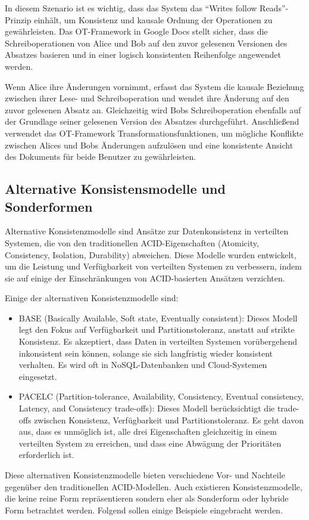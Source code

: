 \documentclass[../vs-script-first-v01.tex]{subfiles}
\begin{document}
In diesem Szenario ist es wichtig, dass das System das \enquote{Writes follow Reads}-Prinzip einhält, um Konsistenz und kausale Ordnung der Operationen zu gewährleisten. Das OT-Framework in Google Docs stellt sicher, dass die Schreiboperationen von Alice und Bob auf den zuvor gelesenen Versionen des Absatzes basieren und in einer logisch konsistenten Reihenfolge angewendet werden.

Wenn Alice ihre Änderungen vornimmt, erfasst das System die kausale Beziehung zwischen ihrer Lese- und Schreiboperation und wendet ihre Änderung auf den zuvor gelesenen Absatz an. Gleichzeitig wird Bobs Schreiboperation ebenfalls auf der Grundlage seiner gelesenen Version des Absatzes durchgeführt. Anschließend verwendet das OT-Framework Transformationsfunktionen, um mögliche Konflikte zwischen Alices und Bobs Änderungen aufzulösen und eine konsistente Ansicht des Dokuments für beide Benutzer zu gewährleisten.

\subsection{Alternative Konsistensmodelle und Sonderformen}
Alternative Konsistenzmodelle sind Ansätze zur Datenkonsistenz in verteilten Systemen, die von den traditionellen ACID-Eigenschaften (Atomicity, Consistency, Isolation, Durability) abweichen. Diese Modelle wurden entwickelt, um die Leistung und Verfügbarkeit von verteilten Systemen zu verbessern, indem sie auf einige der Einschränkungen von ACID-basierten Ansätzen verzichten.

Einige der alternativen Konsistenzmodelle sind:
\begin{itemize}
\item BASE (Basically Available, Soft state, Eventually consistent): Dieses Modell legt den Fokus auf Verfügbarkeit und Partitionstoleranz, anstatt auf strikte Konsistenz. Es akzeptiert, dass Daten in verteilten Systemen vorübergehend inkonsistent sein können, solange sie sich langfristig wieder konsistent verhalten. Es wird oft in NoSQL-Datenbanken und Cloud-Systemen eingesetzt.
\item PACELC (Partition-tolerance, Availability, Consistency, Eventual consistency, Latency, and Consistency trade-offs): Dieses Modell berücksichtigt die trade-offs zwischen Konsistenz, Verfügbarkeit und Partitionstoleranz. Es geht davon aus, dass es unmöglich ist, alle drei Eigenschaften gleichzeitig in einem verteilten System zu erreichen, und dass eine Abwägung der Prioritäten erforderlich ist.
\end{itemize}
Diese alternativen Konsistenzmodelle bieten verschiedene Vor- und Nachteile gegenüber den traditionellen ACID-Modellen. Auch existieren Konsistenzmodelle, die keine reine Form repräsentieren sondern eher als Sonderform oder hybride Form betrachtet werden. Folgend sollen einige Beispiele eingebracht werden. 
\end{document}
